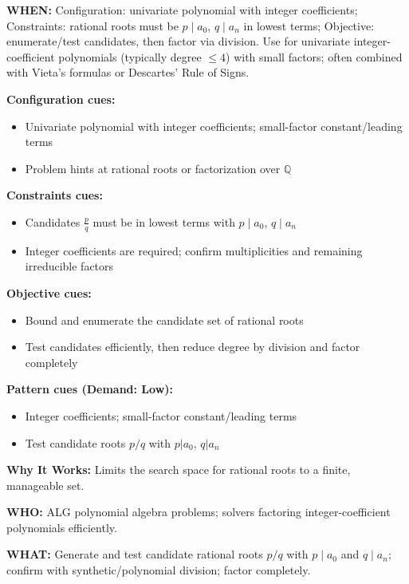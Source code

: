 \documentclass[12pt]{article}
\begin{document}
\textbf{WHEN:} Configuration: univariate polynomial with integer coefficients; Constraints: rational roots must be $p\mid a_0$, $q\mid a_n$ in lowest terms; Objective: enumerate/test candidates, then factor via division. Use for univariate integer-coefficient polynomials (typically degree $\le 4$) with small factors; often combined with Vieta's formulas or Descartes' Rule of Signs.

\textbf{Configuration cues:}
\begin{itemize}
    \item Univariate polynomial with integer coefficients; small-factor constant/leading terms
    \item Problem hints at rational roots or factorization over $\mathbb{Q}$
\end{itemize}

\textbf{Constraints cues:}
\begin{itemize}
    \item Candidates $\frac{p}{q}$ must be in lowest terms with $p\mid a_0$, $q\mid a_n$
    \item Integer coefficients are required; confirm multiplicities and remaining irreducible factors
\end{itemize}

\textbf{Objective cues:}
\begin{itemize}
    \item Bound and enumerate the candidate set of rational roots
    \item Test candidates efficiently, then reduce degree by division and factor completely
\end{itemize}

\textbf{Pattern cues (Demand: Low):}
\begin{itemize}
    \item Integer coefficients; small-factor constant/leading terms
    \item Test candidate roots $p/q$ with $p|a_0$, $q|a_n$
\end{itemize}

\textbf{Why It Works:} Limits the search space for rational roots to a finite, manageable set.

\textbf{WHO:} ALG polynomial algebra problems; solvers factoring integer-coefficient polynomials efficiently.

\textbf{WHAT:} Generate and test candidate rational roots $p/q$ with $p\mid a_0$ and $q\mid a_n$; confirm with synthetic/polynomial division; factor completely.
\end{document}
